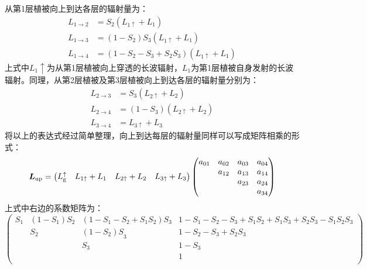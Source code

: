 从第1层植被向上到达各层的辐射量为：
\begin{equation}
  \begin{aligned}
    L_{1 \rightarrow 2} &=S_{2}\left(L_{1 \uparrow}+L_{1}\right) \\[1ex]
    L_{1 \rightarrow 3} &=\left(1-S_{2}\right) S_{3}\left(L_{1 \uparrow}+L_{1}\right) \\[1ex]
    L_{1 \rightarrow 4} &=\left(1-S_{2}-S_{3}+S_{2} S_{3}\right)\left(L_{1 \uparrow}+L_{1}\right)
  \end{aligned}
\end{equation}
上式中$L_1\uparrow$为从第1层植被向上穿透的长波辐射，$L_1$为第1层植被自身发射的长波辐射。同理，从第2层植被及第3层植被向上到达各层的辐射量分别为：
\begin{equation}
  \begin{aligned}
    L_{2 \rightarrow 3} &=S_{3}\left(L_{2 \uparrow}+L_{2}\right) \\[1ex]
    L_{2 \rightarrow 4} &=\left(1-S_{3}\right)\left(L_{2 \uparrow}+L_{2}\right) \\[1ex]
    L_{3 \rightarrow 4} &=L_{3 \uparrow}+L_{3}
  \end{aligned}
\end{equation}
将以上的表达式经过简单整理，向上到达每层的辐射量同样可以写成矩阵相乘的形式：
\begin{equation}
  \boldsymbol {L}_{\rm up}=\left(\begin{matrix}L_{\mathrm {g}} ^\uparrow &L_{1\uparrow}+L_1&L_{2\uparrow}+L_2&L_{3\uparrow}+L_3\\\end{matrix}
  \right)\left(\begin{matrix}a_{01}&a_{02}&a_{03}&a_{04}\\&a_{12}&a_{13}&a_{14}\\
      &&a_{23}&a_{24}\\&&&a_{34}
  \\\end{matrix}\right)
\end{equation}
上式中右边的系数矩阵为：
\begin{equation}
  \left(\begin{matrix}S_1&\left(1-S_1\right)S_2&\left(1-S_1-S_2+S_1S_2\right)S_3&
      1-S_1-S_2-S_3+S_1S_2+S_1S_3+S_2S_3-S_1S_2S_3\\&S_2&{\left(1-S_2\right)S}_3&1-S_2-S_3+S_2S_3\\
  &&S_3&1-S_3\\&&&1\\\end{matrix}\right)
\end{equation}
